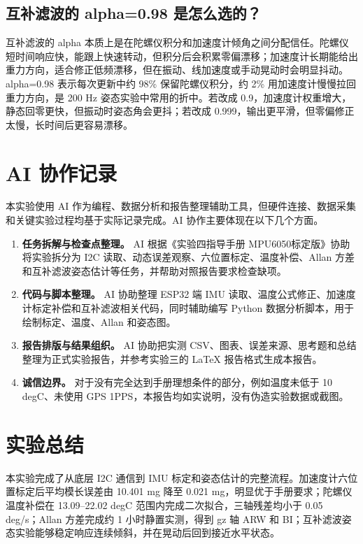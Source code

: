 \documentclass[UTF8,a4paper,12pt]{ctexart}
\begin{document}
\subsection{互补滤波的 alpha=0.98 是怎么选的？}
互补滤波的 alpha 本质上是在陀螺仪积分和加速度计倾角之间分配信任。陀螺仪短时间响应快，能跟上快速转动，但积分后会积累零偏漂移；加速度计长期能给出重力方向，适合修正低频漂移，但在振动、线加速度或手动晃动时会明显抖动。alpha=0.98 表示每次更新中约 98\% 保留陀螺仪积分，约 2\% 用加速度计慢慢拉回重力方向，是 200 Hz 姿态实验中常用的折中。若改成 0.9，加速度计权重增大，静态回零更快，但振动时姿态角会更抖；若改成 0.999，输出更平滑，但零偏修正太慢，长时间后更容易漂移。

\section{AI 协作记录}
本实验使用 AI 作为编程、数据分析和报告整理辅助工具，但硬件连接、数据采集和关键实验过程均基于实际记录完成。AI 协作主要体现在以下几个方面。

\begin{enumerate}
\item \textbf{任务拆解与检查点整理。} AI 根据《实验四指导手册 MPU6050标定版》协助将实验拆分为 I2C 读取、动态误差观察、六位置标定、温度补偿、Allan 方差和互补滤波姿态估计等任务，并帮助对照报告要求检查缺项。
\item \textbf{代码与脚本整理。} AI 协助整理 ESP32 端 IMU 读取、温度公式修正、加速度计标定补偿和互补滤波相关代码，同时辅助编写 Python 数据分析脚本，用于绘制标定、温度、Allan 和姿态图。
\item \textbf{报告排版与结果组织。} AI 协助把实测 CSV、图表、误差来源、思考题和总结整理为正式实验报告，并参考实验三的 LaTeX 报告格式生成本报告。
\item \textbf{诚信边界。} 对于没有完全达到手册理想条件的部分，例如温度未低于 10 degC、未使用 GPS 1PPS，本报告均如实说明，没有伪造实验数据或截图。
\end{enumerate}

\section{实验总结}
本实验完成了从底层 I2C 通信到 IMU 标定和姿态估计的完整流程。加速度计六位置标定后平均模长误差由 10.401 mg 降至 0.021 mg，明显优于手册要求；陀螺仪温度补偿在 13.09--22.02 degC 范围内完成二次拟合，三轴残差均小于 0.05 deg/s；Allan 方差完成约 1 小时静置实测，得到 gz 轴 ARW 和 BI；互补滤波姿态实验能够稳定响应连续倾斜，并在晃动后回到接近水平状态。
\end{document}
